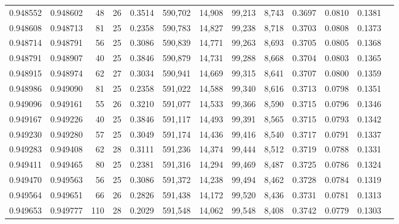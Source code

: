\begin{tabular}{rrrrrrrrrrrrr}
0.948552 & 0.948602 &    48 &  26 &                                     0.3514 & 590,702 &  14,908 &  99,213 &   8,743 & 0.3697 & 0.0810 & 0.1381 \\
0.948608 & 0.948713 &    81 &  25 &                                     0.2358 & 590,783 &  14,827 &  99,238 &   8,718 & 0.3703 & 0.0808 & 0.1373 \\
0.948714 & 0.948791 &    56 &  25 &                                     0.3086 & 590,839 &  14,771 &  99,263 &   8,693 & 0.3705 & 0.0805 & 0.1368 \\
0.948791 & 0.948907 &    40 &  25 &                                     0.3846 & 590,879 &  14,731 &  99,288 &   8,668 & 0.3704 & 0.0803 & 0.1365 \\
0.948915 & 0.948974 &    62 &  27 &                                     0.3034 & 590,941 &  14,669 &  99,315 &   8,641 & 0.3707 & 0.0800 & 0.1359 \\
0.948986 & 0.949090 &    81 &  25 &                                     0.2358 & 591,022 &  14,588 &  99,340 &   8,616 & 0.3713 & 0.0798 & 0.1351 \\
0.949096 & 0.949161 &    55 &  26 &                                     0.3210 & 591,077 &  14,533 &  99,366 &   8,590 & 0.3715 & 0.0796 & 0.1346 \\
0.949167 & 0.949226 &    40 &  25 &                                     0.3846 & 591,117 &  14,493 &  99,391 &   8,565 & 0.3715 & 0.0793 & 0.1342 \\
0.949230 & 0.949280 &    57 &  25 &                                     0.3049 & 591,174 &  14,436 &  99,416 &   8,540 & 0.3717 & 0.0791 & 0.1337 \\
0.949283 & 0.949408 &    62 &  28 &                                     0.3111 & 591,236 &  14,374 &  99,444 &   8,512 & 0.3719 & 0.0788 & 0.1331 \\
0.949411 & 0.949465 &    80 &  25 &                                     0.2381 & 591,316 &  14,294 &  99,469 &   8,487 & 0.3725 & 0.0786 & 0.1324 \\
0.949470 & 0.949563 &    56 &  25 &                                     0.3086 & 591,372 &  14,238 &  99,494 &   8,462 & 0.3728 & 0.0784 & 0.1319 \\
0.949564 & 0.949651 &    66 &  26 &                                     0.2826 & 591,438 &  14,172 &  99,520 &   8,436 & 0.3731 & 0.0781 & 0.1313 \\
0.949653 & 0.949777 &   110 &  28 &                                     0.2029 & 591,548 &  14,062 &  99,548 &   8,408 & 0.3742 & 0.0779 & 0.1303 \\

\end{tabular}
